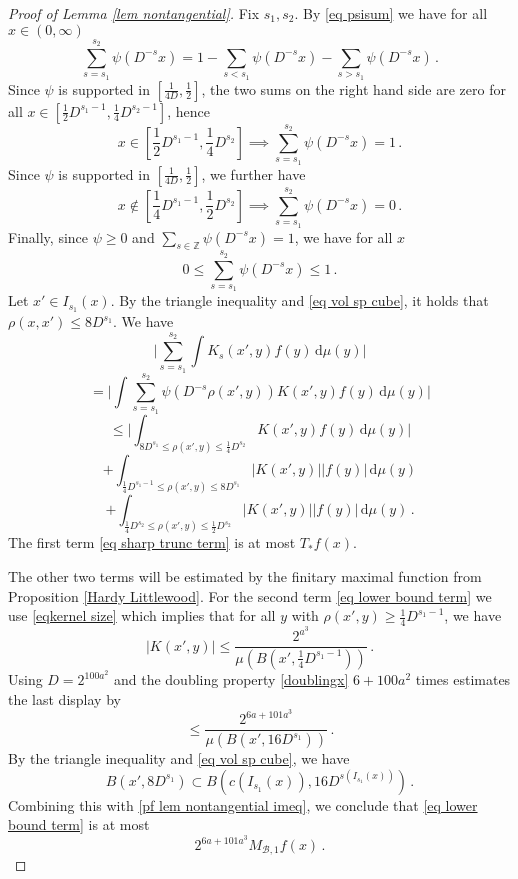 {\begin{proof}[Proof of Lemma \ref{lem nontangential}]
    Fix $s_1, s_2$. By \eqref{eq psisum} we have for all $x \in (0, \infty)$
    $$
        \sum_{s = s_1}^{s_2} \psi(D^{-s}x) = 1 - \sum_{s < s_1} \psi(D^{-s}x) - \sum_{s > s_1} \psi(D^{-s}x)\,.
    $$
    Since $\psi$ is supported in $[\frac{1}{4D}, \frac{1}{2}]$, the two sums on the right hand side are zero for all $x \in [\frac{1}{2}D^{s_1-1}, \frac{1}{4} D^{s_2 - 1}]$, hence
    $$
        x \in  [\frac{1}{2}D^{s_1-1}, \frac{1}{4} D^{s_2}] \implies \sum_{s = s_1}^{s_2} \psi(D^{-s}x) = 1\,.
    $$
    Since $\psi$ is supported in $[\frac{1}{4D}, \frac{1}{2}]$, we further have
    $$
        x \notin [\frac{1}{4}D^{s_1 - 1}, \frac{1}{2}D^{s_2}] \implies \sum_{s = s_1}^{s_2} \psi(D^{-s}x) = 0\,.
    $$
    Finally, since $\psi \ge 0$ and $\sum_{s \in \mathbb{Z}} \psi(D^{-s}x) = 1$, we have for all $x$
    $$
        0 \le \sum_{s = s_1}^{s_2} \psi(D^{-s}x) \le 1\,.
    $$
    Let $x' \in I_{s_1}(x)$. By the triangle inequality and \eqref{eq vol sp cube}, it holds that $\rho(x,x') \le 8D^{s_1}$. We have
    $$
        \Bigg|\sum_{s = s_1}^{s_2} \int K_s(x',y) f(y) \, \mathrm{d}\mu(y)\Bigg|
    $$
    $$
        = \Bigg|\int \sum_{s = s_1}^{s_2} \psi(D^{-s}\rho(x',y)) K(x',y) f(y) \, \mathrm{d}\mu(y)\Bigg|
    $$
    \begin{equation}
        \label{eq sharp trunc term}
        \le \Bigg| \int_{8D^{s_1} \le \rho(x',y) \le \frac{1}{4}D^{s_2}} K(x',y) f(y) \, \mathrm{d}\mu(y) \Bigg|
    \end{equation}
    \begin{equation}
        \label{eq lower bound term}
        + \int_{\frac{1}{4}D^{s_1-1} \le \rho(x',y) \le 8D^{s_1}} |K(x', y)| |f(y)| \, \mathrm{d}\mu(y)
    \end{equation}
    \begin{equation}
        \label{eq upper bound term}
        + \int_{\frac{1}{4}D^{s_2} \le \rho(x',y) \le \frac{1}{2}D^{s_2}} |K(x', y)| |f(y)| \, \mathrm{d}\mu(y)\,.
    \end{equation}
    The first term \eqref{eq sharp trunc term} is at most $T_* f(x)$.

    The other two terms will be estimated by the finitary maximal function from Proposition \ref{Hardy Littlewood}.
    For the second term \eqref{eq lower bound term} we use \eqref{eqkernel size} which implies that for all $y$ with $\rho(x', y) \ge \frac{1}{4}D^{s_1 - 1}$, we have
    $$
        |K(x', y)| \le \frac{2^{a^3}}{\mu(B(x', \frac{1}{4}D^{s_1 - 1}))}\,.
    $$
    Using $D=2^{100a^2}$
    and the doubling property \eqref{doublingx} $6 +100a^2$ times estimates
    the last display by
    \begin{equation}
    \label{pf lem nontangential imeq}
        \le \frac{2^{6a+101a^3}}{\mu(B(x',  16D^{s_1}))}\, .
    \end{equation}
    By the triangle inequality and \eqref{eq vol sp cube}, we have
    $$
        B(x', 8D^{s_1}) \subset B(c(I_{s_1}(x)), 16D^{s(I_{s_1}(x))})\,.
    $$
    Combining this with \eqref{pf lem nontangential imeq}, we conclude that \eqref{eq lower bound term} is at most
    $$
        2^{6a + 101a^3} M_{\mathcal{B},1} f(x)\,.
    $$


\end{proof}}
